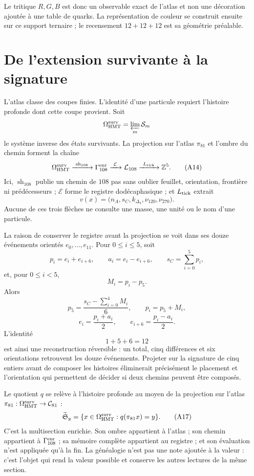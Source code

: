 Le tritique \(R,G,B\) est donc un observable exact de l'atlas et non une
décoration ajoutée à une table de quarks. La représentation de couleur se
construit ensuite sur ce support ternaire ; le recensement \(12+12+12\) est sa
géométrie préalable.

\section{De l'extension survivante à la signature}

L'atlas classe des coupes finies. L'identité d'une particule requiert
l'histoire profonde dont cette coupe provient. Soit
\[
 \Omega_{\rm HMT}^{\rm surv}
 =\varprojlim_m\mathcal S_m
\]
le système inverse des états survivants. La projection sur l'atlas \(\pi_{81}\) et l'ombre
du chemin forment la chaîne
\[
 \Omega_{\rm HMT}^{\rm surv}
 \xrightarrow{\ \operatorname{sh}_{108}\ }
 \Gamma_{108}^{\rm enr}
 \xrightarrow{\ \mathcal E\ }
 \mathcal L_{108}
 \xrightarrow{\ L_{\rm tick}\ }
 \mathbb Z^5.
 \tag{A14}\label{eq:cadena-extension-firma-atlas-rev6}
\]
Ici, \(\operatorname{sh}_{108}\) publie un chemin de \(108\) pas sans
oublier feuillet, orientation, frontière ni prédécesseurs ; \(\mathcal E\) forme le
registre dodécaphasique ; et \(L_{\rm tick}\) extrait
\[
 v(x)=
 \bigl(n_A,s_C,k_{\Delta_4},\nu_{120},\nu_{270}\bigr).
 \tag{A15}\label{eq:firma-cinco-extension-rev6}
\]
Aucune de ces trois flèches ne consulte une masse, une unité ou le nom
d'une particule.

La raison de conserver le registre avant la projection se voit dans ses douze
événements orientés \(e_0,\ldots,e_{11}\). Pour \(0\leq i\leq5\), soit
\[
 p_i=e_i+e_{i+6},
 \qquad
 a_i=e_i-e_{i+6},
 \qquad
 s_C=\sum_{i=0}^{5}p_i,
\]
et, pour \(0\leq i<5\),
\[
 M_i=p_i-p_5.
\]
Alors
\[
 p_5=\frac{s_C-\sum_{i=0}^{4}M_i}{6},
 \qquad
 p_i=p_5+M_i,
\]
\[
 e_i=\frac{p_i+a_i}{2},
 \qquad
 e_{i+6}=\frac{p_i-a_i}{2}.
 \tag{A16}\label{eq:reconstruccion-registro-doce}
\]
L’identité
\[
 1+5+6=12
\]
est ainsi une reconstruction réversible : un total, cinq différences et six
orientations retrouvent les douze événements. Projeter sur la signature de cinq
entiers avant de composer les histoires éliminerait précisément le placement et
l'orientation qui permettent de décider si deux chemins peuvent être composés.

Le quotient \(q\) se relève à l'histoire profonde au moyen de la projection sur l'atlas
\(\pi_{81}:\Omega_{\rm HMT}^{\rm surv}\to\mathcal C_{81}\) :
\[
 \widetilde{\mathfrak S}_y
 =\{x\in\Omega_{\rm HMT}^{\rm surv}:q(\pi_{81}x)=y\}.
 \tag{A17}\label{eq:multiseccion-enriquecida-rev6}
\]
C'est la multisection enrichie. Son ombre appartient à l'atlas ; son chemin
appartient à \(\Gamma_{108}^{\rm enr}\) ; sa mémoire complète appartient au
registre ; et son évaluation n'est appliquée qu'à la fin. La généalogie n'est pas une
note ajoutée à la valeur : c'est l'objet qui rend la valeur possible et conserve les
autres lectures de la même section.

